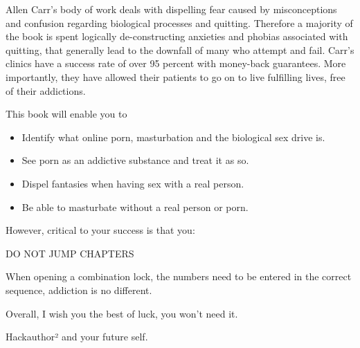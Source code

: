\documentclass[easypeasy.tex]{subfiles}
\begin{document}
Allen Carr's body of work deals with dispelling fear caused by misconceptions and confusion regarding biological processes and quitting. Therefore a majority of the book is spent logically de-constructing anxieties and phobias associated with quitting, that generally lead to the downfall of many who attempt and fail. Carr's clinics have a success rate of over 95 percent with money-back guarantees. More importantly, they have allowed their patients to go on to live fulfilling lives, free of their addictions.

This book will enable you to
\begin{itemize}
  \item Identify what online porn, masturbation and the biological sex drive is.
  \item See porn as an addictive substance and treat it as so.
  \item Dispel fantasies when having sex with a real person.
  \item Be able to masturbate without a real person or porn.
\end{itemize}

However, critical to your success is that you:

{\huge DO NOT JUMP CHAPTERS}

When opening a combination lock, the numbers need to be entered in the correct sequence, addiction is no different.

Overall, I wish you the best of luck, you won't need it.

Hackauthor² and your future self.
\end{document}
